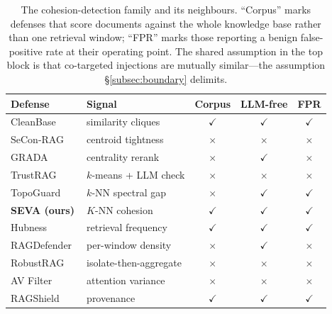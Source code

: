 \documentclass[10pt,journal,compsoc]{IEEEtran}
\begin{document}
\begin{table}[t]
\centering
\footnotesize
\setlength{\tabcolsep}{3pt}
\caption{The cohesion-detection family and its neighbours. ``Corpus'' marks defenses that score
documents against the whole knowledge base rather than one retrieval window; ``FPR'' marks those
reporting a benign false-positive rate at their operating point. The shared assumption in the
top block is that co-targeted injections are mutually similar---the assumption
\S\ref{subsec:boundary} delimits.}
\label{tab:family}
\begin{tabular}{llccc}
\toprule
Defense & Signal & Corpus & LLM-free & FPR \\
\midrule
CleanBase~\cite{cleanbase}   & similarity cliques & $\checkmark$ & $\checkmark$ & $\checkmark$ \\
SeCon-RAG~\cite{secon}       & centroid tightness & $\times$ & $\times$ & $\times$ \\
GRADA~\cite{grada}           & centrality rerank & $\times$ & $\checkmark$ & $\times$ \\
TrustRAG~\cite{trustrag}     & $k$-means + LLM check & $\times$ & $\times$ & $\times$ \\
TopoGuard~\cite{topoguard}   & $k$-NN spectral gap & $\times$ & $\checkmark$ & $\checkmark$ \\
\textbf{SEVA (ours)}         & $K$-NN cohesion & $\checkmark$ & $\checkmark$ & $\checkmark$ \\
\midrule
Hubness~\cite{hubness}       & retrieval frequency & $\checkmark$ & $\checkmark$ & $\checkmark$ \\
RAGDefender~\cite{ragdefender}& per-window density & $\times$ & $\checkmark$ & $\times$ \\
RobustRAG~\cite{robustrag}   & isolate-then-aggregate & $\times$ & $\times$ & $\times$ \\
AV Filter~\cite{avfilter}    & attention variance & $\times$ & $\times$ & $\times$ \\
RAGShield~\cite{ragshield}   & provenance & $\checkmark$ & $\checkmark$ & $\checkmark$ \\
\bottomrule
\end{tabular}
\end{table}
\end{document}
